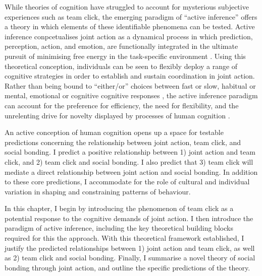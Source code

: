 \begin{CJK}{UTF8}{gbsn}
While theories of cognition have struggled to account for mysterious subjective experiences such as team click, the emerging paradigm of ``active inference'' \citep{Friston2010} offers a theory in which elements of these identifiable phenomena can be tested.  Active inference conpcetualises joint action as a dynamical process in which prediction, perception, action, and emotion, are functionally integrated in the ultimate pursuit of minimising free energy in the task-specific environment \citep{Clark2015}.  Using this theoretical conception, individuals can be seen to flexibly deploy a range of cognitive strategies in order to establish and sustain coordination in joint action.  Rather than being bound to ``either/or'' choices between fast or slow, habitual or mental, emotional or cognitive cognitive responses \citep[cf.][]{Kahneman2011}, the active inference paradigm can account for the preference for efficiency, the need for flexibility, and the unrelenting drive for novelty displayed by processes of human cognition \citep{Friston2011,Chetverikov2016}.


An active conception of human cognition opens up a space for testable predictions concerning the relationship between joint action, team click, and social bonding.  I predict a positive relationship between 1) joint action and team click, and 2) team click and social bonding.  I also predict that 3) team click will mediate a direct relationship between joint action and social bonding. In addition to these core predictions, I accommodate for the role of cultural and individual variation in shaping and constraining patterns of behaviour.

In this chapter, I begin by introducing the phenomenon of team click as a potential response to the cognitive demands of joint action.  I then introduce the paradigm of active inference, including the key theoretical building blocks required for this the approach.  With this theoretical framework established, I justify the predicted relationships between 1) joint action and team click, as well as 2) team click and social bonding.  Finally, I summarise a novel theory of social bonding through joint action, and outline the specific predictions of the theory.




\end{CJK}
